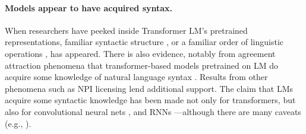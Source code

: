 \documentclass[11pt,a4paper]{article}
\begin{document}
\paragraph{Models appear to have acquired syntax.} When researchers have peeked inside Transformer LM's pretrained representations, familiar syntactic structure \citep{hewitt-manning-2019-structural,jawahar-etal-2019-bert, lin-etal-2019-open, warstadt-bowman-2020-can, wu-etal-2020-perturbed}, or a familiar order of linguistic operations \citep{jawahar-etal-2019-bert,  tenney-etal-2019-bert}, has appeared. There is also evidence, notably from agreement attraction phenomena \citep{linzen-etal-2016-assessing} that transformer-based models pretrained on LM do acquire some knowledge of natural language syntax \citep{gulordava-etal-2018-colorless, chrupala-alishahi-2019-correlating,  jawahar-etal-2019-bert, lin-etal-2019-open, manning-etal-2020-emergent,  hawkins-etal-2020-investigating, linzen-baroni-2021-syntactic}. Results from other phenomena \citep{warstadt-bowman-2020-can} such as NPI licensing  \citep{warstadt-etal-2019-investigating} lend additional support. The claim that LMs acquire some syntactic knowledge has been made not only for transformers, but also for convolutional neural nets \citep{bernardy-lappin-2017-using}, and RNNs \citep{gulordava-etal-2018-colorless, van-schijndel-linzen-2018-neural, wilcox-etal-2018-rnn, zhang-bowman-2018-language, prasad-etal-2019-using, ravfogel-etal-2019-studying}---although there are many caveats (e.g., \citealt{ravfogel-etal-2018-lstm, white-etal-2018-lexicosyntactic,  davis-van-schijndel-2020-recurrent, chaves-2020-dont, da-costa-chaves-2020-assessing, kodner-gupta-2020-overestimation}). 
\end{document}
